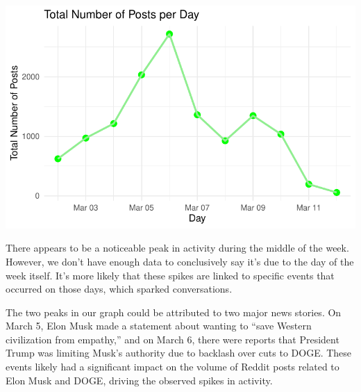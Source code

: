 \documentclass[
  letterpaper,
  DIV=11,
  numbers=noendperiod]{scrartcl}
\begin{document}
\includegraphics{Reddit_eda_files/figure-pdf/unnamed-chunk-5-2.pdf}

There appears to be a noticeable peak in activity during the middle of
the week. However, we don't have enough data to conclusively say it's
due to the day of the week itself. It's more likely that these spikes
are linked to specific events that occurred on those days, which sparked
conversations.

The two peaks in our graph could be attributed to two major news
stories. On March 5, Elon Musk made a statement about wanting to ``save
Western civilization from empathy,'' and on March 6, there were reports
that President Trump was limiting Musk's authority due to backlash over
cuts to DOGE. These events likely had a significant impact on the volume
of Reddit posts related to Elon Musk and DOGE, driving the observed
spikes in activity.
\end{document}
